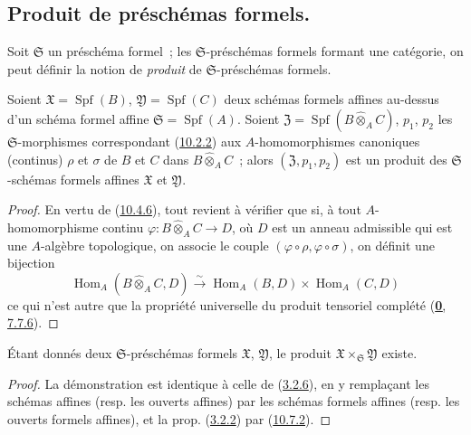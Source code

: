 \subsection{Produit de préschémas formels.}
\label{subsection:I.10.7-fr}

\begin{env}[10.7.1]
\label{I.10.7.1-fr}
Soit $\mathfrak{S}$ un préschéma formel~; les $\mathfrak{S}$-préschémas
formels formant une catégorie, on peut définir la notion de
\emph{produit} de $\mathfrak{S}$-préschémas formels.
\end{env}

\begin{proposition}[10.7.2]
\label{I.10.7.2-fr}
Soient $\mathfrak{X}=\operatorname{Spf}(B)$,
$\mathfrak{Y}=\operatorname{Spf}(C)$ deux schémas formels affines
au-dessus d'un schéma formel affine
$\mathfrak{S}=\operatorname{Spf}(A)$. Soient
$\mathfrak{Z}=\operatorname{Spf}(B\widehat{\otimes}_A C)$,
$p_1$, $p_2$ les $\mathfrak{S}$-morphismes correspondant
\textup{(\hyperref[I.10.2.2-fr]{10.2.2})} aux $A$-homomorphismes canoniques
(continus) $\rho$ et $\sigma$ de $B$ et $C$ dans
$B\widehat{\otimes}_A C$~; alors $(\mathfrak{Z},p_1,p_2)$ est un produit
des $\mathfrak{S}$-schémas formels affines $\mathfrak{X}$ et
$\mathfrak{Y}$.
\end{proposition}

\begin{proof}
En vertu de (\hyperref[I.10.4.6-fr]{10.4.6}), tout revient à vérifier que
si, à tout $A$-homomorphisme continu
$\varphi:B\widehat{\otimes}_A C\to D$, où $D$ est un anneau admissible qui
est une $A$-algèbre topologique, on associe le couple
$(\varphi\circ\rho,\varphi\circ\sigma)$, on définit une bijection
\[
  \operatorname{Hom}_A(B\widehat{\otimes}_A C,D)
  \xrightarrow{\sim}
  \operatorname{Hom}_A(B,D)\times\operatorname{Hom}_A(C,D)
\]
ce qui n'est autre que la propriété universelle du produit tensoriel
complété (\hyperref[0.7.7.6-fr]{\textbf{0}, 7.7.6}).
\end{proof}

\begin{proposition}[10.7.3]
\label{I.10.7.3-fr}
Étant donnés deux $\mathfrak{S}$-préschémas formels
$\mathfrak{X}$, $\mathfrak{Y}$, le produit
$\mathfrak{X}\times_{\mathfrak{S}}\mathfrak{Y}$ existe.
\end{proposition}

\begin{proof}
La démonstration est identique à celle de
(\hyperref[I.3.2.6-fr]{3.2.6}), en y remplaçant les schémas affines
(resp. les ouverts affines) par les schémas formels affines (resp. les
ouverts formels affines), et la prop.
(\hyperref[I.3.2.2-fr]{3.2.2}) par
(\hyperref[I.10.7.2-fr]{10.7.2}).
\end{proof}

